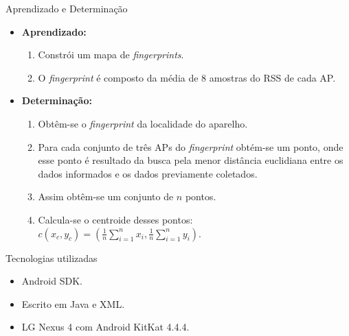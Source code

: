 \documentclass{beamer}
\newlength{\wideitemsep}
\let\olditem\item
\renewcommand{\item}{\setlength{\itemsep}{\wideitemsep}\olditem}
\begin{document}
\begin{frame}{Aprendizado e Determinação}
\begin{itemize}
 \olditem \textbf{Aprendizado:}
  \begin{enumerate}
    \item Constrói um mapa de \textit{fingerprints}.
    \item O \textit{fingerprint} é composto da média de 8 amostras do RSS de cada AP.
  \end{enumerate}
 
 \olditem \textbf{Determinação:}
    \begin{enumerate}

    \item Obtêm-se o \textit{fingerprint} da localidade do aparelho.
    \item Para cada conjunto de três APs do \textit{fingerprint} obtém-se um ponto, onde 
    esse ponto é resultado da busca pela menor distância euclidiana entre os dados informados e os dados
    previamente coletados.
    \item Assim obtêm-se um conjunto de $n$ pontos.
    \item Calcula-se o centroide desses pontos: $c(x_c,y_c) = (\frac{1}{n}\sum_{i=1}^{n}x_{i},\frac{1}{n}\sum_{i=1}^{n}y_{i})$.  
    \end{enumerate}
\end{itemize}
\end{frame}

\begin{frame}{Tecnologias utilizadas}
\begin{itemize}
 \item Android SDK.
 \item Escrito em Java e XML.
 \item LG Nexus 4 com Android KitKat 4.4.4.
\end{itemize}
\end{frame}
\end{document}
